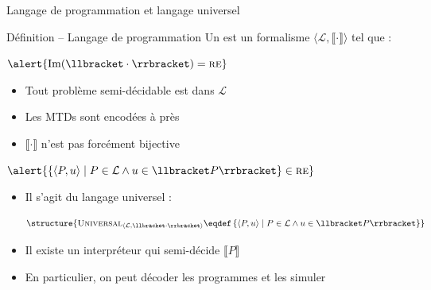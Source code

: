 
\begingroup

\begin{frame}{Langage de programmation et langage universel}

  \vspace{-2mm}
  \begin{block}{Définition -- Langage de programmation}
    Un  est un formalisme 
    \alert{$\langle \mathcal{L}, \llbracket \cdot \rrbracket \rangle$} tel que :
    \begin{description}
    \item[Turing-complet :] $\alert{\operatorname{Im}(\llbracket \cdot \rrbracket) = \textsc{re}}$
      \begin{itemize}\small
      \item Tout problème semi-décidable est  dans $\mathcal{L}$
      \item Les MTDs sont encodées à  près
      \item $\llbracket \cdot \rrbracket$ n'est pas forcément bijective
      \end{itemize}
    \item[Effectif :] $\alert{\left\{ \langle P, u \rangle \mid P \in \mathcal{L} \land u \in \llbracket P \rrbracket \right\} \in \textsc{re}}$
      \begin{itemize}\small
      \item Il s'agit du langage universel :

        \vspace{-2mm}
        $$\structure{\textsc{Universal}_{\langle \mathcal{L}, \llbracket \cdot \rrbracket \rangle} \eqdef \left\{ \langle P, u \rangle \mid P \in \mathcal{L} \land u \in \llbracket P \rrbracket \right\}}$$
      \item\vspace{-1mm} Il existe un interpréteur qui semi-décide $\llbracket P \rrbracket$
      \item En particulier, on peut décoder les programmes et les simuler
      \end{itemize}
    \end{description}
  \end{block}


\end{frame}

